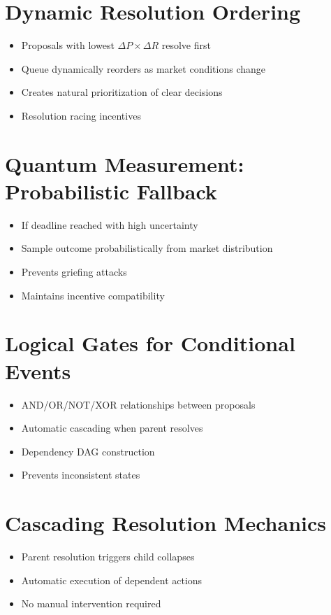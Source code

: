 \documentclass{article}
\begin{document}
\section{Dynamic Resolution Ordering}
\begin{itemize}
    \item Proposals with lowest $\Delta P \times \Delta R$ resolve first
    \item Queue dynamically reorders as market conditions change
    \item Creates natural prioritization of clear decisions
    \item Resolution racing incentives
\end{itemize}

\section{Quantum Measurement: Probabilistic Fallback}
\begin{itemize}
   \item If deadline reached with high uncertainty
   \item Sample outcome probabilistically from market distribution
   \item Prevents griefing attacks
   \item Maintains incentive compatibility
\end{itemize}

\section{Logical Gates for Conditional Events}
\begin{itemize}
    \item AND/OR/NOT/XOR relationships between proposals
    \item Automatic cascading when parent resolves
    \item Dependency DAG construction
    \item Prevents inconsistent states
\end{itemize}

\section{Cascading Resolution Mechanics}
\begin{itemize}
    \item Parent resolution triggers child collapses
    \item Automatic execution of dependent actions
    \item No manual intervention required
\end{itemize}
\end{document}
